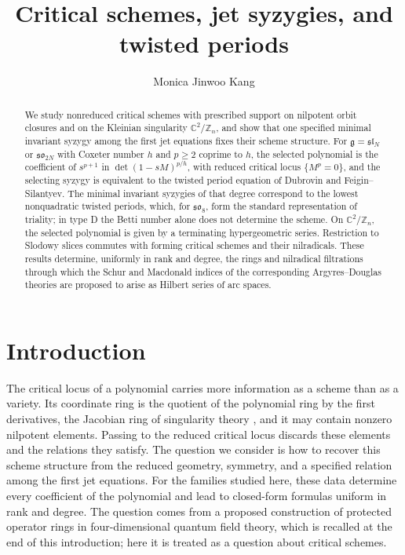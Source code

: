 \documentclass[10pt,reqno]{amsart}
\title[Critical schemes, jet syzygies, and twisted periods]{Critical schemes, jet syzygies, and twisted periods}
\author{Monica Jinwoo Kang}
\numberwithin{equation}{section}
\theoremstyle{plain}
\theoremstyle{definition}
\begin{document}
\begin{abstract}
We study nonreduced critical schemes with prescribed support on nilpotent orbit closures and on the Kleinian singularity $\mathbb C^2/\mathbb Z_n$, and show that one specified minimal invariant syzygy among the first jet equations fixes their scheme structure. For $\mathfrak g=\mathfrak{sl}_N$ or $\mathfrak{so}_{2N}$ with Coxeter number $h$ and $p\ge2$ coprime to $h$, the selected polynomial is the coefficient of $s^{p+1}$ in $\det(1-sM)^{p/h}$, with reduced critical locus $\{M^p=0\}$, and the selecting syzygy is equivalent to the twisted period equation of Dubrovin and Feigin--Silantyev. The minimal invariant syzygies of that degree correspond to the lowest nonquadratic twisted periods, which, for $\mathfrak{so}_8$, form the standard representation of triality; in type D the Betti number alone does not determine the scheme. On $\mathbb C^2/\mathbb Z_n$, the selected polynomial is given by a terminating hypergeometric series. Restriction to Slodowy slices commutes with forming critical schemes and their nilradicals. These results determine, uniformly in rank and degree, the rings and nilradical filtrations through which the Schur and Macdonald indices of the corresponding Argyres--Douglas theories are proposed to arise as Hilbert series of arc spaces.
\end{abstract}

\maketitle

\setcounter{tocdepth}{2}
\tableofcontents
\setlength{\parskip}{4pt plus 1pt minus 1pt}

\section{Introduction}\label{sec:intro}

The critical locus of a polynomial carries more information as a scheme than as a variety. Its coordinate ring is the quotient of the polynomial ring by the first derivatives, the Jacobian ring of singularity theory \cite{AGZV}, and it may contain nonzero nilpotent elements. Passing to the reduced critical locus discards these elements and the relations they satisfy. The question we consider is how to recover this scheme structure from the reduced geometry, symmetry, and a specified relation among the first jet equations. For the families studied here, these data determine every coefficient of the polynomial and lead to closed-form formulas uniform in rank and degree. The question comes from a proposed construction of protected operator rings in four-dimensional quantum field theory, which is recalled at the end of this introduction; here it is treated as a question about critical schemes.
\end{document}
